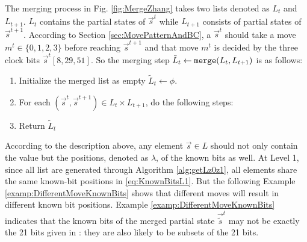 The merging process in Fig. \ref{fig:MergeZhang} takes two lists denoted as $L_t$ and $L_{t+1}$.
$L_{t}$ contains the partial states of $\vec{ s}^t$ while $L_{t+1}$ consists of partial states of $\vec{s}^{t+1}$.
According to Section \ref{sec:MovePatternAndBC}, a $\vec{s}^t$ should take a move $m^t\in \{0,1,2,3\}$ before reaching $\vec{s}^{t+1}$ and that move $m^t$ is decided by the three clock bits $\vec{s}^t[8,29,51]$.
So the merging step $\tilde{L}_t\leftarrow {\tt merge}(L_t, L_{t+1})$ is as follows:
\begin{enumerate}
  \item Initialize the merged list as empty $\tilde{L}_t\leftarrow \phi$.
  \item For each $(\vec{s}^t,\vec{s}^{t+1})\in L_t\times L_{t+1}$, do the following steps:
  \item Return $\tilde{L}_t$
\end{enumerate}
According to the description above, any element $\vec{s}\in L$ should not only contain the value but the positions, denoted as $\lambda$, of the known bits as well.
At Level 1, since all list are generated through Algorithm \ref{alg:getLz0z1}, all elements share the same known-bit positions in \eqref{eq:KnownBitsL1}.
But the following Example \ref{examp:DifferentMoveKnownBits} shows that different moves will result in different known bit positions.
Example \ref{examp:DifferentMoveKnownBits} indicates that the known bits of the merged partial state $\vec{\tilde{s}}^t$ may not be exactly the 21 bits given in \cite{AC:Zhang19}: they are also likely to be subsets of the 21 bits.
